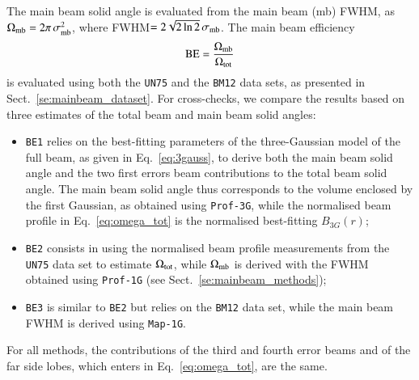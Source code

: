 



{\rev The main beam solid angle is evaluated from the main beam (mb) FWHM, as
$\Omega_{\rm{mb}} = 2 \pi\,  \sigma_{\rm{mb}}^2$, where
FWHM$ =2\sqrt{2\ln{2}}\, \sigma_{\rm{mb}}$. The main beam efficiency
\begin{equation}
\rm{BE} = \frac{\Omega_{\rm{mb}}}{\Omega_{\rm{tot}}}
\end{equation}
is evaluated using both the {\tt UN75} and the {\tt BM12} data sets,
as presented in Sect.~\ref{se:mainbeam_dataset}.} For cross-checks, we
compare the results based on three estimates of the total beam and
main beam solid angles:
\begin{itemize}
  \item{{\tt BE1} relies on the best-fitting parameters of the
    three-Gaussian model of the full beam, as given in
    Eq.~\ref{eq:3gauss}, to derive both the main beam solid angle and
    the two first errors beam contributions to the total beam solid
    angle. The main beam solid angle thus corresponds to the volume
    enclosed by the first Gaussian, as obtained using {\tt Prof-3G},
    while the normalised beam profile in Eq.~\ref{eq:omega_tot} is the
    normalised best-fitting $B_{3G}(r)$;}
  \item{{\tt BE2} consists in using the normalised beam profile
    measurements from the {\tt UN75} data set to estimate
    $\Omega_{\rm{tot}}$, while $\Omega_{\rm{mb}}$ is
    derived with the FWHM obtained using {\tt Prof-1G} (see
    Sect.~\ref{se:mainbeam_methods});}
  \item{{\tt BE3} is similar to {\tt BE2} but relies on the {\tt BM12}
    data set, while the main beam FWHM is derived using {\tt Map-1G}.}  
\end{itemize}
For all methods, the contributions of the third and fourth error beams
and of the far side lobes, which enters in Eq.~\ref{eq:omega_tot}, are
the same. 

